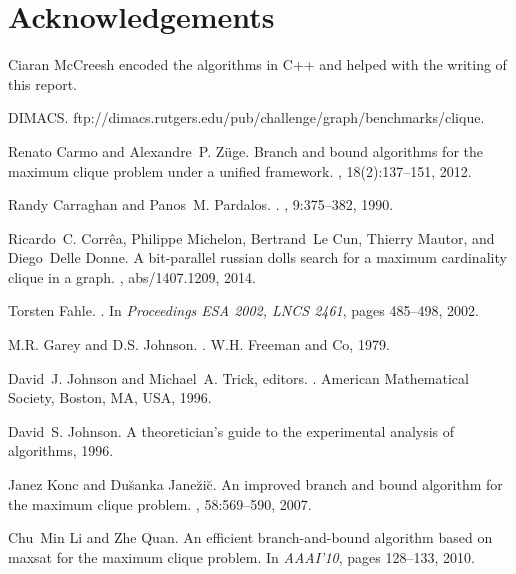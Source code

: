 \documentclass[runningheads]{llncs}
\begin{document}
\section*{Acknowledgements}
Ciaran McCreesh encoded the algorithms in C++ and helped with the writing of this report. 

\begin{thebibliography}{10}

{DIMACS}.
\newblock ftp://dimacs.rutgers.edu/pub/challenge/graph/benchmarks/clique.

Renato Carmo and Alexandre~P. Z{\"u}ge.
\newblock Branch and bound algorithms for the maximum clique problem under a
  unified framework.
, 18(2):137--151, 2012.

Randy Carraghan and Panos~M. Pardalos.
.
, 9:375--382, 1990.

Ricardo~C. Corr{\^{e}}a, Philippe Michelon, Bertrand~Le Cun, Thierry Mautor,
  and Diego~Delle Donne.
\newblock A bit-parallel russian dolls search for a maximum cardinality clique
  in a graph.
, abs/1407.1209, 2014.

Torsten Fahle.
.
\newblock In {\em Proceedings {ESA 2002}, LNCS 2461}, pages 485--498, 2002.

M.R. Garey and D.S. Johnson.
.
\newblock W.H. Freeman and Co, 1979.

David~J. Johnson and Michael~A. Trick, editors.
.
\newblock American Mathematical Society, Boston, MA, USA, 1996.

David~S. Johnson.
\newblock A theoretician's guide to the experimental analysis of algorithms,
  1996.

Janez Konc and Du\u{s}anka Jane\u{z}i\u{c}.
\newblock An improved branch and bound algorithm for the maximum clique
  problem.
,
  58:569--590, 2007.

Chu~Min Li and Zhe Quan.
\newblock An efficient branch-and-bound algorithm based on maxsat for the
  maximum clique problem.
\newblock In {\em AAAI'10}, pages 128--133, 2010.


\end{thebibliography}
\end{document}
